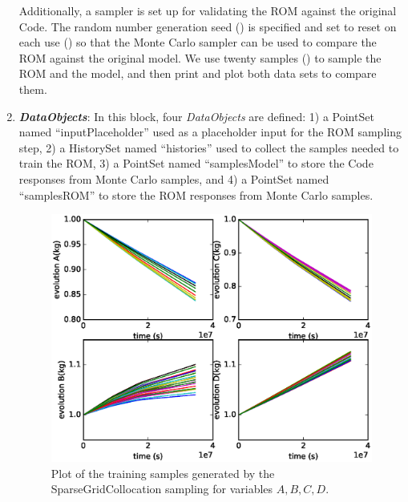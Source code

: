 \begin{enumerate}
  Additionally, a  sampler is set up for validating the ROM against the original Code.  The random
  number generation seed () is specified and set to reset on each use
  () so that the Monte Carlo sampler can be used to compare the ROM against the
  original model.  We use twenty samples () to sample the ROM and the model, and then print and
  plot both data sets to compare them.
   \item \textbf{\textit{DataObjects}}:
  In this block, four \textit{DataObjects} are defined:
  1) a PointSet named ``inputPlaceholder'' used as a placeholder input for the ROM sampling step,
  2) a HistorySet named ``histories'' used to collect the samples needed to train the ROM,
  3) a PointSet named ``samplesModel'' to store the Code responses from Monte Carlo samples, and
  4) a PointSet named ``samplesROM'' to store the ROM responses from Monte Carlo samples.
 \begin{figure}[h!]
  \centering
  \includegraphics[scale=0.7]{../../tests/framework/user_guide/ForwardSamplingStrategies/gold/RunDir/SparseGrid/1-historyPlot_line-line-line-line.eps}
  \caption{Plot of the training samples generated by the SparseGridCollocation sampling for variables $A,B,C,D$.}
  \label{fig:historiesSparseGridPlotLine}
 \end{figure}

\end{enumerate}
